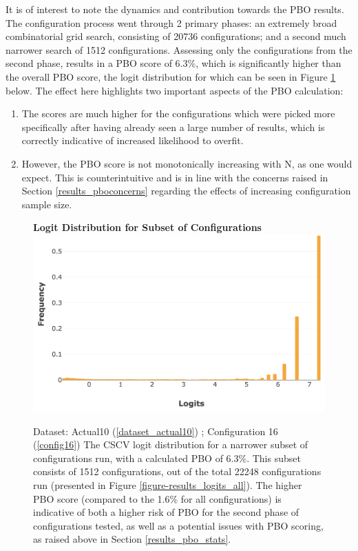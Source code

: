 \documentclass[a4paper,11pt,oneside]{article}
\theoremstyle{plain}
\theoremstyle{definition}
\begin{document}
	
	It is of interest to note the dynamics and contribution towards the PBO results. The configuration process went through 2 primary phases: an extremely broad combinatorial grid search, consisting of 20736 configurations; and a second much narrower search of 1512 configurations. Assessing only the configurations from the second phase, results in a PBO score of 6.3\%, which is significantly higher than the overall PBO score, the logit distribution for which can be seen in Figure \ref{figure-results_logits_subset} below. The effect here highlights two important aspects of the PBO calculation:
	\begin{enumerate}
		\item The scores are much higher for the configurations which were picked more specifically after having already seen a large number of results, which is correctly indicative of increased likelihood to overfit.
		\item However, the PBO score is not monotonically increasing with N, as one would expect. This is counterintuitive and is in line with the concerns raised in Section \ref{results_pboconcerns} regarding the effects of increasing configuration sample size.
	\end{enumerate}
	
	\begin{figure}[H]
		\centering 
		\textbf{Logit Distribution for Subset of Configurations}
		\includegraphics[scale=0.3]{images/results/8_9_pbo/subset_dist.png} 
		\caption[Logit Distribution for Subset of Configurations]{Dataset: Actual10 (\ref{dataset_actual10}) ; Configuration 16 (\ref{config16})
			\newline The CSCV logit distribution for a narrower subset of configurations run, with a calculated PBO of 6.3\%. This subset consists of 1512 configurations, out of the total 22248 configurations run (presented in Figure \ref{figure-results_logits_all}). The higher PBO score (compared to the 1.6\% for all configurations) is indicative of both a higher risk of PBO for the second phase of configurations tested, as well as a potential issues with PBO scoring, as raised above in Section \ref{results_pbo_stats}.}
		\label{figure-results_logits_subset}
	\end{figure}
	
\end{document}
